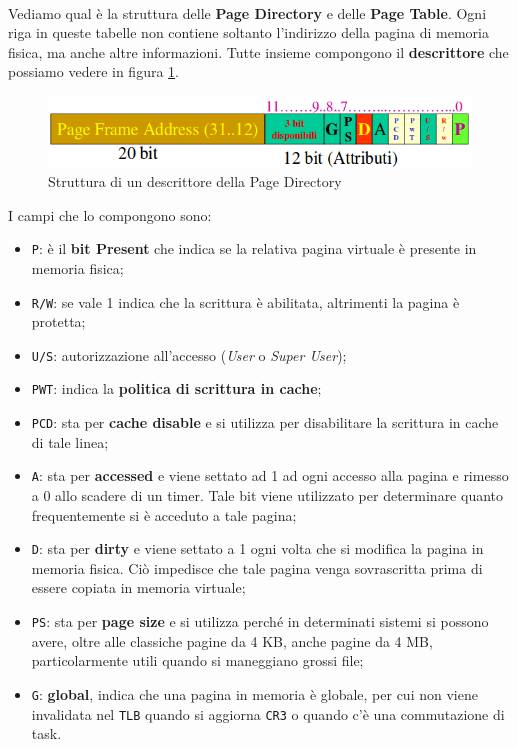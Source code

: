 \documentclass[11pt]{book}
\begin{document}
\

Vediamo qual \`e la struttura delle \textbf{Page Directory} e delle
\textbf{Page Table}. Ogni riga in queste tabelle non contiene soltanto
l'indirizzo della pagina di memoria fisica, ma anche altre
informazioni. Tutte insieme compongono il \textbf{descrittore} che
possiamo vedere in figura \ref{pdpt}.

\begin{figure}[h]
  \centering
  \includegraphics[width=.7\textwidth]{images/pdpt.png}
  \caption{Struttura di un descrittore della Page Directory}
  \label{pdpt}
\end{figure}

I campi che lo compongono sono:

\begin{itemize}
\item \texttt{P}: \`e il \textbf{bit Present} che indica se la
  relativa pagina virtuale \`e presente in memoria fisica;
\item \texttt{R/W}: se vale 1 indica che la scrittura \`e abilitata,
  altrimenti la pagina \`e protetta;
\item \texttt{U/S}: autorizzazione all'accesso (\textit{User} o
  \textit{Super User});
\item \texttt{PWT}: indica la \textbf{politica di scrittura in
    cache}; %
\item \texttt{PCD}: sta per \textbf{cache disable} e si utilizza per
  disabilitare la scrittura in cache di tale linea;
\item \texttt{A}: sta per \textbf{accessed} e viene settato ad 1 ad
  ogni accesso alla pagina e rimesso a 0 allo scadere di un
  timer. Tale bit viene utilizzato per determinare quanto
  frequentemente si \`e acceduto a tale pagina;
\item \texttt{D}: sta per \textbf{dirty} e viene settato a 1 ogni
  volta che si modifica la pagina in memoria fisica. Ci\`o impedisce
  che tale pagina venga sovrascritta prima di essere copiata in
  memoria virtuale;
\item \texttt{PS}: sta per \textbf{page size} e si utilizza perch\'e
  in determinati sistemi si possono avere, oltre alle classiche pagine
  da 4 KB, anche pagine da 4 MB, particolarmente utili quando si
  maneggiano grossi file;
\item \texttt{G}: \textbf{global}, indica che una pagina in memoria
  \`e globale, per cui non viene invalidata nel \texttt{TLB} quando si
  aggiorna \texttt{CR3} o quando c'\`e una commutazione di task.
\end{itemize}
\end{document}
